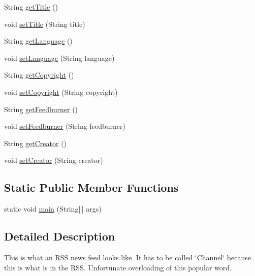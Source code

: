 \begin{DoxyCompactItemize}
\item 
String \hyperlink{classgov_1_1fnal_1_1ppd_1_1dd_1_1testing_1_1news_1_1Channel_acf2cf29674132eca2c953827c0cc4a09}{get\-Title} ()
\item 
void \hyperlink{classgov_1_1fnal_1_1ppd_1_1dd_1_1testing_1_1news_1_1Channel_afa4eff66db8872326e6abfa31d6fe1bd}{set\-Title} (String title)
\item 
String \hyperlink{classgov_1_1fnal_1_1ppd_1_1dd_1_1testing_1_1news_1_1Channel_aa04830d23933071e5c9f74993ed7d199}{get\-Language} ()
\item 
void \hyperlink{classgov_1_1fnal_1_1ppd_1_1dd_1_1testing_1_1news_1_1Channel_a43e8eb547dc4afc89854760683998209}{set\-Language} (String language)
\item 
String \hyperlink{classgov_1_1fnal_1_1ppd_1_1dd_1_1testing_1_1news_1_1Channel_ac97c6b8822d46a537df2b1861c05b6aa}{get\-Copyright} ()
\item 
void \hyperlink{classgov_1_1fnal_1_1ppd_1_1dd_1_1testing_1_1news_1_1Channel_a32ca1c6ea6201a2b6e9836d37177cc02}{set\-Copyright} (String copyright)
\item 
String \hyperlink{classgov_1_1fnal_1_1ppd_1_1dd_1_1testing_1_1news_1_1Channel_a925192c7e75ada168b17ac0c734c3049}{get\-Feedburner} ()
\item 
void \hyperlink{classgov_1_1fnal_1_1ppd_1_1dd_1_1testing_1_1news_1_1Channel_adc8c876fbb40c13e30307637953eb990}{set\-Feedburner} (String feedburner)
\item 
String \hyperlink{classgov_1_1fnal_1_1ppd_1_1dd_1_1testing_1_1news_1_1Channel_abb1072e32bd4245967215cd9087ce0b8}{get\-Creator} ()
\item 
void \hyperlink{classgov_1_1fnal_1_1ppd_1_1dd_1_1testing_1_1news_1_1Channel_ac056142fcb57127d39d3bef0f69c9057}{set\-Creator} (String creator)
\end{DoxyCompactItemize}
\subsection*{Static Public Member Functions}
\begin{DoxyCompactItemize}
\item 
static void \hyperlink{classgov_1_1fnal_1_1ppd_1_1dd_1_1testing_1_1news_1_1Channel_a7eb29c0a564b013df0643f3c82041c50}{main} (String\mbox{[}$\,$\mbox{]} args)
\end{DoxyCompactItemize}


\subsection{Detailed Description}
This is what an R\-S\-S news feed looks like. It has to be called \char`\"{}\-Channel\char`\"{} because this is what is in the R\-S\-S. Unfortunate overloading of this popular word.

